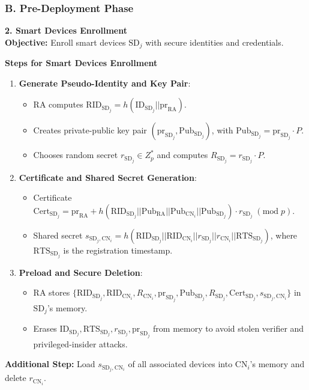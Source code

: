 \documentclass[9pt,handout]{beamer}
\begin{document}
\begin{frame}
    \frametitle{B. Pre-Deployment Phase }
    \textbf{2. Smart Devices Enrollment\\}
    \textbf{Objective:} Enroll smart devices \(\text{SD}_j\) with secure identities and credentials.

    \textbf{Steps for Smart Devices Enrollment}
    \begin{enumerate}
        \item \textbf{Generate Pseudo-Identity and Key Pair}:
        \begin{itemize}
            \item RA computes \( \text{RID}_{\text{SD}_j} = h(\text{ID}_{\text{SD}_j} || \text{pr}_{\text{RA}}) \).
            \item Creates private-public key pair \( (\text{pr}_{\text{SD}_j}, \text{Pub}_{\text{SD}_j}) \), with \( \text{Pub}_{\text{SD}_j} = \text{pr}_{\text{SD}_j} \cdot P \).
            \item Chooses random secret \( r_{\text{SD}_j} \in Z^*_p \) and computes \( R_{\text{SD}_j} = r_{\text{SD}_j} \cdot P \).
        \end{itemize}
        \item \textbf{Certificate and Shared Secret Generation}:
        \begin{itemize}
            \item Certificate \( \text{Cert}_{\text{SD}_j} = \text{pr}_{\text{RA}} + h(\text{RID}_{\text{SD}_j} || \text{Pub}_{\text{RA}} || \text{Pub}_{\text{CN}_i} || \text{Pub}_{\text{SD}_j}) \cdot r_{\text{SD}_j} \;(\text{mod} \; p) \).
            \item Shared secret \( s_{\text{SD}_j, \text{CN}_i} = h(\text{RID}_{\text{SD}_j} || \text{RID}_{\text{CN}_i} || r_{\text{SD}_j} || r_{\text{CN}_i} || \text{RTS}_{\text{SD}_j}) \), where \( \text{RTS}_{\text{SD}_j} \) is the registration timestamp.
        \end{itemize}
        \item \textbf{Preload and Secure Deletion}:
        \begin{itemize}
            \item RA stores \( \{\text{RID}_{\text{SD}_j}, \text{RID}_{\text{CN}_i}, R_{\text{CN}_i}, \text{pr}_{\text{SD}_j}, \text{Pub}_{\text{SD}_j}, R_{\text{SD}_j}, \text{Cert}_{\text{SD}_j}, s_{\text{SD}_j, \text{CN}_i}\} \) in \( \text{SD}_j \)'s memory.
            \item Erases \( \text{ID}_{\text{SD}_j}, \text{RTS}_{\text{SD}_j}, r_{\text{SD}_j}, \text{pr}_{\text{SD}_j} \) from memory  to avoid stolen verifier and privileged-insider
 attacks.
        \end{itemize}
    \end{enumerate}
    
    \textbf{Additional Step:} Load \( s_{\text{SD}_j, \text{CN}_i} \) of all associated devices into \( \text{CN}_i \)'s memory and delete \( r_{\text{CN}_i} \).
\end{frame}
\end{document}
